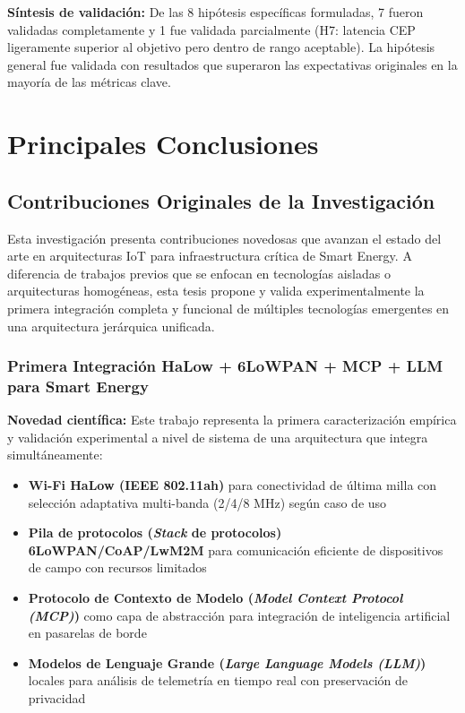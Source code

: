\textbf{Síntesis de validación:} De las 8 hipótesis específicas formuladas, 7 fueron validadas completamente y 1 fue validada parcialmente (H7: latencia CEP ligeramente superior al objetivo pero dentro de rango aceptable). La hipótesis general fue validada con resultados que superaron las expectativas originales en la mayoría de las métricas clave.

\section{Principales Conclusiones}

\subsection{Contribuciones Originales de la Investigación}

Esta investigación presenta contribuciones novedosas que avanzan el estado del arte en arquitecturas IoT para infraestructura crítica de Smart Energy. A diferencia de trabajos previos que se enfocan en tecnologías aisladas o arquitecturas homogéneas, esta tesis propone y valida experimentalmente la primera integración completa y funcional de múltiples tecnologías emergentes en una arquitectura jerárquica unificada.

\subsubsection{Primera Integración HaLow + 6LoWPAN + MCP + LLM para Smart Energy}

\textbf{Novedad científica:} Este trabajo representa la primera caracterización empírica y validación experimental a nivel de sistema de una arquitectura que integra simultáneamente:

\begin{itemize}
\item \textbf{Wi-Fi HaLow (IEEE 802.11ah)} para conectividad de última milla con selección adaptativa multi-banda (2/4/8 MHz) según caso de uso
\item \textbf{Pila de protocolos (\textit{Stack} de protocolos) 6LoWPAN/CoAP/LwM2M} para comunicación eficiente de dispositivos de campo con recursos limitados
\item \textbf{Protocolo de Contexto de Modelo (\textit{Model Context Protocol (MCP)})} como capa de abstracción para integración de inteligencia artificial en pasarelas de borde
\item \textbf{Modelos de Lenguaje Grande (\textit{Large Language Models (LLM)})} locales para análisis de telemetría en tiempo real con preservación de privacidad
\end{itemize}

